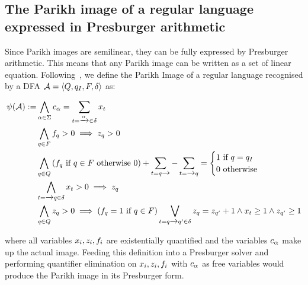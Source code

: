 \documentclass[acmsmall,review,anonymous]{acmart}\settopmatter{printfolios=true,printccs=false,printacmref=true}
\theoremstyle{definition}
\begin{document}
\subsection{The Parikh image of a regular language expressed in Presburger arithmetic}

Since Parikh images are semilinear, they can be fully expressed by Presburger
arithmetic. This means that any Parikh image can be written as a set of linear
equation. Following~\cite{generate-parikh-image}, we define the Parikh Image of
a regular language recognised by a DFA $\mathcal{A} = \left\langle Q, q_I, F, \delta\right\rangle$ as:

\begin{equation}
\begin{aligned}
\ParikhMap(\Automaton) := 
& \AndComp{\Letter \in \Alphabet}{\LetterVar_{\Letter} = \sum_{\Transition = \FromLabelTo{}{\Letter}{} \in \Transitions} \TransitionVar_{\Transition}
}\\
& \AndComp{\State \in \AcceptingStates}{\FinalStateVar_{\State} > 0 \implies \StateVar_{\State} > 0}\\
& \AndComp{\State \in \States}{
  \left(\FinalStateVar_{\State} \text{ if } \State \in \AcceptingStates \text{ otherwise } 0 \right) +
  \sum_{\Transition = \FromLabelTo{\State}{}{}} - \sum_{\Transition = \FromLabelTo{}{}{\State}}
= \begin{cases}
    1 \text{  if $\State = \InitialState$} \\
    0 \text{ otherwise}
  \end{cases}
}\\
& \AndComp{\Transition = \FromLabelTo{}{}{\State} \in \Transitions}{
  \TransitionVar_{\Transition} > 0 \implies \StateVar_{\State}
} \\
& \AndComp{\State \in \States}{
  \StateVar_{\State} > 0 \implies
  \left(\FinalStateVar_{\State} = 1 \text{ if } \State \in \AcceptingStates\right) \OrComp{\Transition = \FromLabelTo{\State}{}{\State'} \in \Transitions}{
    \StateVar_{\State} = \StateVar_{\State'} + 1 \land 
    \TransitionVar_{\Transition} \geq 1 \land
  \StateVar_{\State'} \geq 1
    }
}
\end{aligned}
\label{eq:generate-parikh}
\end{equation}

where all variables $x_i, z_i, f_i$ are existentially quantified and the variables
$c_\alpha$ make up the actual image. Feeding this definition into a Presburger
solver and performing quantifier elimination on $x_i, z_i, f_i$ with $c_\alpha$ as free variables would produce the
Parikh image in its Presburger form.
\end{document}
